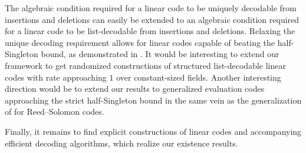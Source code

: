 \documentclass[draft, onecolumn, 11pt]{IEEEtran}
\begin{document}
The algebraic condition required for a linear code to be uniquely decodable from insertions and deletions can easily be extended to an algebraic condition required for a linear code to be list-decodable from insertions and deletions. Relaxing the unique decoding requirement allows for linear codes capable of beating the half-Singleton bound, as demonstrated in \cite{li2026rateone}. It would be interesting to extend our framework to get randomized constructions of structured list-decodable linear codes with rate approaching $1$ over constant-sized fields. Another interesting direction would be to extend our results to generalized evaluation codes approaching the strict half-Singleton bound in the same vein as the generalization of \cite{liu2024optimal} for Reed--Solomon codes. 

Finally, it remains to find explicit constructions of linear codes and accompanying efficient decoding algorithms, which realize our existence results.  



\end{document}
